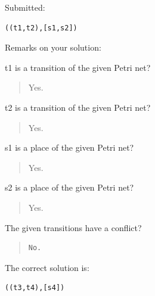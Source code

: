 Submitted:


\begin{verbatim}
((t1,t2),[s1,s2])
\end{verbatim}


Remarks on your solution:

t1 is a transition of the given Petri net?\begin{quote}Yes.\end{quote}t2 is a transition of the given Petri net?\begin{quote}Yes.\end{quote}s1 is a place of the given Petri net?\begin{quote}Yes.\end{quote}s2 is a place of the given Petri net?\begin{quote}Yes.\end{quote}The given transitions have a conflict?

\begin{quote}
\begin{verbatim}
No.
\end{verbatim}
\end{quote}

The correct solution is:
\begin{verbatim}
((t3,t4),[s4])
\end{verbatim}


